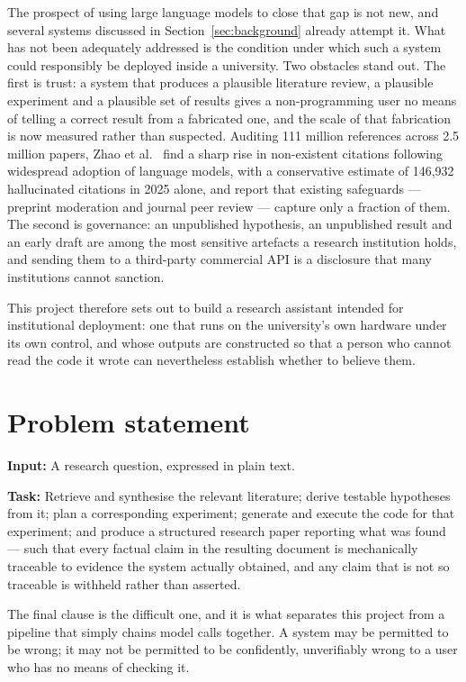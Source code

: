 The prospect of using large language models to close that gap is not new, and several systems
discussed in Section~\ref{sec:background} already attempt it. What has not been adequately
addressed is the condition under which such a system could responsibly be deployed inside a
university. Two obstacles stand out. The first is trust: a system that produces a plausible
literature review, a plausible experiment and a plausible set of results gives a
non-programming user no means of telling a correct result from a fabricated one, and the
scale of that fabrication is now measured rather than suspected. Auditing 111 million
references across 2.5 million papers, Zhao et al.~\cite{zhao2026hallucinations} find a sharp
rise in non-existent citations following widespread adoption of language models, with a
conservative estimate of 146,932 hallucinated citations in 2025 alone, and report that
existing safeguards --- preprint moderation and journal peer review --- capture only a
fraction of them. The second is governance: an
unpublished hypothesis, an unpublished result and an early draft are among the most sensitive
artefacts a research institution holds, and sending them to a third-party commercial API is
a disclosure that many institutions cannot sanction.

This project therefore sets out to build a research assistant intended for institutional
deployment: one that runs on the university's own hardware under its own control, and whose
outputs are constructed so that a person who cannot read the code it wrote can nevertheless
establish whether to believe them.

\section{Problem statement}
\label{sec:problem}

\noindent\textbf{Input:} A research question, expressed in plain text.

\noindent\textbf{Task:} Retrieve and synthesise the relevant literature; derive testable
hypotheses from it; plan a corresponding experiment; generate and execute the code for that
experiment; and produce a structured research paper reporting what was found --- such that
every factual claim in the resulting document is mechanically traceable to evidence the system
actually obtained, and any claim that is not so traceable is withheld rather than asserted.

The final clause is the difficult one, and it is what separates this project from a pipeline
that simply chains model calls together. A system may be permitted to be wrong; it may not be
permitted to be confidently, unverifiably wrong to a user who has no means of checking it.

